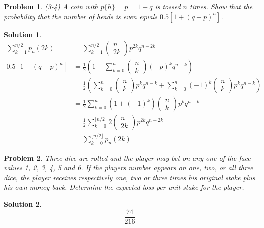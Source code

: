 \documentclass{article}
\newtheorem{problem}{Problem}[section]
\newtheorem{solution}{Solution}[section]
\begin{document}
		\begin{problem}
			(3-4) A coin with $p\{h\}=p=1-q$ is tossed $n$ times. Show that the probability that the number of heads is even equals $0.5[1+(q-p)^n]$.
		\end{problem}
		\begin{solution}
			\begin{align*}
				\sum_{k=1}^{n/2}{p_n(2k)}&=\sum_{k=1}^{n/2}
				\begin{pmatrix}
					n\\
					2k
				\end{pmatrix}
				{p^{2k}q^{n-2k}}\\
				0.5[1+(q-p)^n]&=\frac{1}{2}\left(1+\sum_{k=0}^n
				\begin{pmatrix}
					n\\
					k
				\end{pmatrix}
				{(-p)^kq^{n-k}}\right)\\
				&=\frac{1}{2}\left(\sum_{k=0}^n
				\begin{pmatrix}
					n\\
					k
				\end{pmatrix}
				{p^kq^{n-k}}+\sum_{k=0}^n(-1)^k
				\begin{pmatrix}
					n\\
					k
				\end{pmatrix}
				{p^kq^{n-k}}\right)\\
				&=\frac{1}{2}\sum_{k=0}^n(1+(-1)^k)
				\begin{pmatrix}
					n\\
					k
				\end{pmatrix}
				{p^kq^{n-k}}\\
				&=\frac{1}{2}\sum_{k=0}^{\lfloor n/2\rfloor}2
				\begin{pmatrix}
					n\\
					2k
				\end{pmatrix}
				{p^{2k}q^{n-2k}}\\
				&=\sum_{k=0}^{\lfloor n/2\rfloor}{p_n(2k)}
			\end{align*}
		\end{solution}
		\begin{problem}
			Three dice are rolled and the player may bet on any one of the face values 1, 2, 3, 4, 5 and 6. If the players number appears on one, two, or all three dice, the player receives respectively one, two or three times his original stake plus his own money back. Determine the expected loss per unit stake for the player.
		\end{problem}
		\begin{solution}
			\begin{equation*}
				\frac{74}{216}
			\end{equation*}
		\end{solution}		
\end{document}
